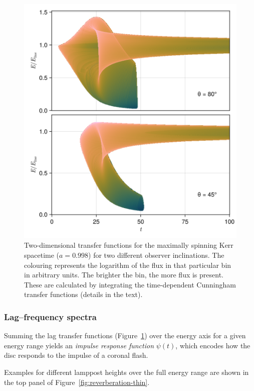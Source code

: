 \documentclass[fleqn,usenatbib]{mnras}
\begin{document}
\begin{figure}
    \centering
    \includegraphics[width=0.97\columnwidth]{figures/transfer-functions.2d.png}
    \caption{Two-dimensional transfer functions for the maximally spinning Kerr
        spacetime ($a = 0.998$) for two different observer inclinations. The
        colouring represents the logarithm of the flux in that particular bin in
        arbitrary units. The brighter the bin, the more flux is present. These
        are calculated by integrating the time-dependent Cunningham transfer
        functions
    (details in the text).}
    \label{fig:lag-frequency-transfer-functions}
\end{figure}

\subsubsection{Lag--frequency spectra}

Summing the lag transfer functions
(Figure~\ref{fig:lag-frequency-transfer-functions}) over the energy axis for a
given energy range yields an \textit{impulse response function} $\psi(t)$, which
encodes how the disc responds to the impulse of a coronal flash.

Examples for different lamppost heights over the full energy range are shown in
the top panel of Figure~\ref{fig:reverberation-thin}.
\end{document}
